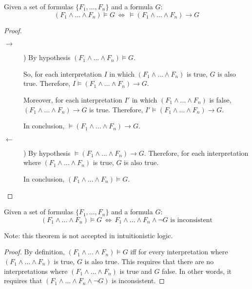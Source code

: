 \begin{theorem}[Deduction] 
    Given a set of formulas $\{ F_1, \dots, F_n \}$ and a formula $G$:
    \[ (F_1 \land \dots \land F_n) \models G \,\iff\, \models (F_1 \land \dots \land F_n) \rightarrow G \]

    \begin{proof} \phantom{}
        \begin{description}
            \item[$\rightarrow$])
                By hypothesis $(F_1 \land \dots \land F_n) \models G$.

                So, for each interpretation $I$ in which $(F_1 \land \dots \land F_n)$ is true, $G$ is also true.
                Therefore, $I \models (F_1 \land \dots \land F_n) \rightarrow G$.

                Moreover, for each interpretation $I'$ in which $(F_1 \land \dots \land F_n)$ is false,
                $(F_1 \land \dots \land F_n) \rightarrow G$ is true.
                Therefore, $I' \models (F_1 \land \dots \land F_n) \rightarrow G$.

                In conclusion, $\models (F_1 \land \dots \land F_n) \rightarrow G$.

            \item[$\leftarrow$]) 
                By hypothesis $\models (F_1 \land \dots \land F_n) \rightarrow G$.
                Therefore, for each interpretation where $(F_1 \land \dots \land F_n)$ is true,
                $G$ is also true.

                In conclusion, $(F_1 \land \dots \land F_n) \models G$.
        \end{description}
    \end{proof}
\end{theorem}

\begin{theorem}[Refutation] 
    Given a set of formulas $\{ F_1, \dots, F_n \}$ and a formula $G$:
    \[ (F_1 \land \dots \land F_n) \models G \,\iff\, F_1 \land \dots \land F_n \land \lnot G \text{ is inconsistent} \]

    Note: this theorem is not accepted in intuitionistic logic.

    \begin{proof}
        By definition, $(F_1 \land \dots \land F_n) \models G$ iff for every interpretation where 
        $(F_1 \land \dots \land F_n)$ is true, $G$ is also true.
        This requires that there are no interpretations where $(F_1 \land \dots \land F_n)$ is true and $G$ false.
        In other words, it requires that $(F_1 \land \dots \land F_n \land \lnot G)$ is inconsistent.
    \end{proof}
\end{theorem}


